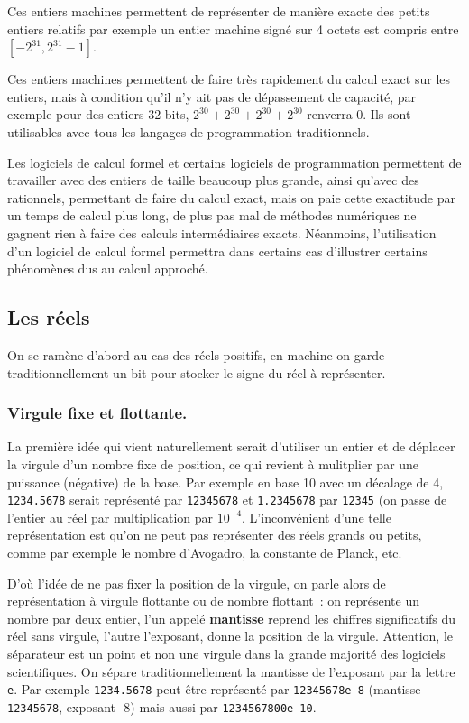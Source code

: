 \documentclass[a4paper,11pt]{article}
\begin{document}
\begin{giacjshere}
Ces entiers machines permettent
de représenter de manière exacte des petits entiers relatifs 
par exemple un entier machine sign\'e sur 4 octets est
compris entre $[-2^{31},2^{31}-1]$. 

Ces entiers machines permettent de faire très rapidement
du calcul exact sur les
entiers, mais \`a condition qu'il n'y ait pas de d\'epassement
de capacit\'e, par exemple pour des entiers 32 bits, $2^{30}+2^{30}+2^{30}+2^{30}$
renverra 0. Ils sont utilisables avec tous les langages de
programmation traditionnels.

Les logiciels de calcul formel et certains logiciels
de programmation permettent de travailler avec
des entiers de taille beaucoup plus grande, ainsi qu'avec des
rationnels, permettant de faire du calcul exact, mais on paie
cette exactitude par un temps de calcul plus long, de plus
pas mal de m\'ethodes num\'eriques ne gagnent rien \`a
faire des calculs interm\'ediaires exacts. N\'eanmoins, l'utilisation
d'un logiciel de calcul formel permettra dans certains cas d'illustrer
certains ph\'enom\`enes dus au calcul approch\'e.

\subsection{Les r\'eels}
On se ram\`ene d'abord au cas des r\'eels positifs, en machine
on garde traditionnellement un bit pour stocker le signe du r\'eel
\`a repr\'esenter.

\subsubsection{Virgule fixe et flottante.}
La premi\`ere id\'ee qui vient naturellement serait d'utiliser
un entier et de d\'eplacer la virgule
d'un nombre fixe de position, ce qui revient \`a mulitplier
par une puissance (n\'egative) de la base. Par exemple en base 10 avec un
d\'ecalage de 4, \verb|1234.5678|
serait repr\'esent\'e par \verb|12345678| et \verb|1.2345678| par
\verb|12345| (on passe de l'entier au r\'eel par multiplication
par $10^{-4}$. L'inconv\'enient d'une telle repr\'esentation est
qu'on ne peut pas repr\'esenter des r\'eels grands ou petits,
comme par exemple le nombre d'Avogadro, la constante de Planck, etc.

D'o\`u l'id\'ee de ne pas fixer la position de la virgule, on parle
alors de repr\'esentation \`a virgule flottante ou de nombre flottant~: on
repr\'esente un nombre par deux entier, l'un appel\'e {\bf mantisse}
reprend les chiffres significatifs du r\'eel sans virgule, l'autre
l'exposant, donne la position de la virgule. Attention, le séparateur
est un point et non une virgule dans la grande
majorité des logiciels scientifiques.
On s\'epare
traditionnellement la mantisse de l'exposant par la lettre \verb|e|.
Par exemple \verb|1234.5678| peut \^etre repr\'esent\'e 
par \verb|12345678e-8| (mantisse \verb|12345678|, exposant -8)
mais aussi par \verb|1234567800e-10|.


\end{giacjshere}
\end{document}
